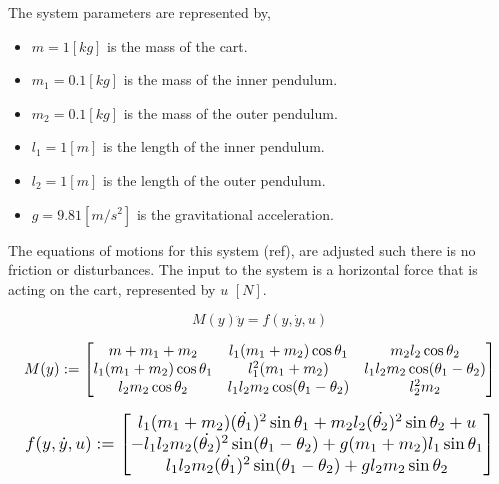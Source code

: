 \documentclass{LTHtwocol} %
\begin{document}
The system parameters are represented by,
\begin{itemize}
\item $m = 1 [kg]$ is the mass of the cart.
\item $m_1 = 0.1 [kg]$ is the mass of the inner pendulum.
\item $m_2 = 0.1[kg]$ is the mass of the outer pendulum.
\item $l_1 = 1 [m]$ is the length of the inner pendulum.
\item $l_2 = 1[m]$ is the length of the outer pendulum.
\item $g = 9.81 [m/s^2]$ is the gravitational acceleration.
 \end{itemize}

The equations of motions for this system (ref), are adjusted such there is no friction or disturbances.
The input to the system is a horizontal force that is acting on the cart, represented by $u$ $[N]$.

\begin{equation}
M(y) \ddot{y} = f(y,\dot{y},u)
\end{equation}


\begin{equation}
\resizebox{ \columnwidth}{!}
{
$
M(y) :=
\begin{bmatrix}
m + m_1 +m_2 & l_1(m_1+m_2)\cos \theta_1 & m_2 l_2 \cos \theta_2 \\
l_1 (m_1 + m_2) \cos \theta_1 & l_1^2(m_1+m_2) & l_1 l_2 m_2 \cos(\theta_1 - \theta_2) \\
l_2 m_2 \cos \theta_2 & l_1 l_2 m_2 \cos (\theta_1 - \theta_2) & l_2^2 m_2
\end{bmatrix}
$
}
\end{equation}

\begin{equation}
\resizebox{ \columnwidth}{!}
{
$
f(y,\dot{y},u) :=
\begin{bmatrix}
l_1(m_1+m_2) (\dot{\theta_1})^2 \sin \theta_1 + m_2 l_2 (\dot{\theta_2})^2 \sin \theta_2 + u\\
-l_1l_2m_2(\dot{\theta_2})^2 \sin(\theta_1 - \theta_2) + g(m_1 + m_2)l_1 \sin \theta_1 \\
l_1l_2m_2(\dot{\theta_1})^2 \sin (\theta_1 - \theta_2) + g l_2 m_2 \sin \theta_2
\end{bmatrix}
 $
 }
\end{equation}
\end{document}

